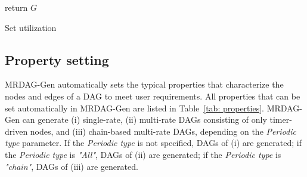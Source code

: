 \begin{algorithm}[t]
    {\footnotesize
        return $G$
        \caption{Set utilization}
        \label{alg: set_utilization}
    }
\end{algorithm}


\subsection{Property setting}
\label{ssec: set_properties}

MRDAG-Gen automatically sets the typical properties that characterize the nodes and edges of a DAG to meet user requirements.
All properties that can be set automatically in MRDAG-Gen are listed in Table~\ref{tab: properties}.
MRDAG-Gen can generate (i) single-rate, (ii) multi-rate DAGs consisting of only timer-driven nodes, and (iii) chain-based multi-rate DAGs, depending on the {\it Periodic type} parameter.
If the {\it Periodic type} is not specified, DAGs of (i) are generated; if the {\it Periodic type} is {\it "All"}, DAGs of (ii) are generated; if the {\it Periodic type} is {\it "chain"}, DAGs of (iii) are generated.

